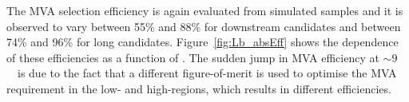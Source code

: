 %
%
The MVA selection efficiency is again evaluated from simulated samples
and it is observed to vary between 55\% and 88\% for downstream candidates
and between 74\% and 96\% for long candidates.
Figure~\ref{fig:Lb_absEff} shows the dependence of these efficiencies as a function of \qsq.
The sudden jump in MVA efficiency at $\sim 9$~\gevcc~is due to the fact that
a different figure-of-merit is used to optimise the MVA requirement in the low- and high-\qsq regions,
which results in different efficiencies.
%

